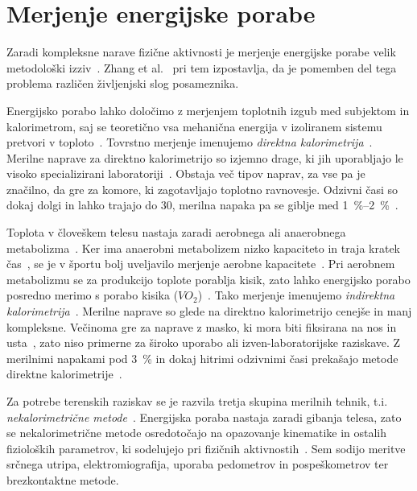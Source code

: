 \section{Merjenje energijske porabe}\label{sec:merjenje}
Zaradi kompleksne narave fizične aktivnosti je merjenje energijske porabe velik metodološki izziv~\cite{zhang2004improving}. Zhang et al.~\cite{zhang2004improving} pri tem izpostavlja, da je pomemben del tega problema različen življenjski slog posameznika. 

Energijsko porabo lahko določimo z merjenjem toplotnih izgub med subjektom in kalorimetrom, saj se teoretično vsa mehanična energija v izoliranem sistemu pretvori v toploto~\cite{levine2005measurement}. Tovrstno merjenje imenujemo \emph{direktna kalorimetrija}~\cite{levine2005measurement}. Merilne naprave za direktno kalorimetrijo so izjemno drage, ki jih uporabljajo le visoko specializirani laboratoriji~\cite{levine2005measurement}. Obstaja več tipov naprav, za vse pa je značilno, da gre za komore, ki zagotavljajo toplotno ravnovesje. Odzivni časi so dokaj dolgi in lahko trajajo do \SI{30}{\min}, merilna napaka pa se giblje med \SI{1}{\%}--\SI{2}{\%}~\cite{levine2005measurement}.

Toplota v človeškem telesu nastaja zaradi aerobnega ali anaerobnega metabolizma~\cite{scott2005misconceptions}. Ker ima anaerobni metabolizem nizko kapaciteto in traja kratek čas~\cite{sahlin1998energy}, se je v športu bolj uveljavilo merjenje aerobne kapacitete~\cite{scott2005misconceptions,howley1995criteria}. Pri aerobnem metabolizmu se za produkcijo toplote porablja kisik, zato lahko energijsko porabo posredno merimo s porabo kisika (${VO}_2$)~\cite{scott2005misconceptions}. Tako merjenje imenujemo \emph{indirektna kalorimetrija}~\cite{levine2005measurement}. Merilne naprave so glede na direktno kalorimetrijo cenejše in manj kompleksne. Večinoma gre za naprave z masko, ki mora biti fiksirana na nos in usta~\cite{levine2005measurement}, zato niso primerne za široko uporabo ali izven-laboratorijske raziskave. Z merilnimi napakami pod \SI{3}{\%} in dokaj hitrimi odzivnimi časi prekašajo metode direktne kalorimetrije~\cite{levine2005measurement}.

Za potrebe terenskih raziskav se je razvila tretja skupina merilnih tehnik, t.i. \emph{nekalorimetrične metode}~\cite{levine2005measurement}. Energijska poraba nastaja zaradi gibanja telesa, zato se nekalorimetrične metode osredotočajo na opazovanje kinematike in ostalih fizioloških parametrov, ki sodelujejo pri fizičnih aktivnostih~\cite{levine2005measurement}. Sem sodijo meritve srčnega utripa, elektromiografija, uporaba pedometrov in pospeškometrov ter brezkontaktne metode.

